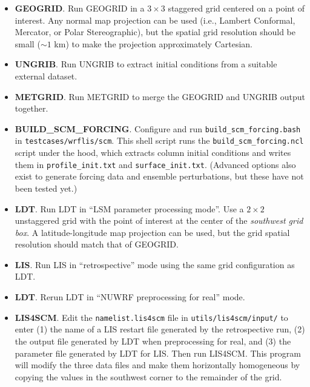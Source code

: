 \begin{itemize}

\item \textbf{GEOGRID}.  Run GEOGRID in a $3 \times 3$ staggered grid centered
on a point of interest.  Any normal map projection can be used (i.e., Lambert
Conformal, Mercator, or Polar Stereographic), but the spatial grid resolution
should be small ($\sim1$ km) to make the projection approximately Cartesian.

\item \textbf{UNGRIB}.  Run UNGRIB to extract initial conditions from a 
suitable external dataset.

\item \textbf{METGRID}.  Run METGRID to merge the GEOGRID and UNGRIB output 
together.

\item \textbf{BUILD\_SCM\_FORCING}.  Configure and run 
\texttt{build\_scm\_forcing.bash} in \texttt{testcases/wrflis/scm}.  This
shell script runs the \texttt{build\_scm\_forcing.ncl} script under the hood,
which extracts column initial conditions and writes them in
\texttt{profile\_init.txt} and \texttt{surface\_init.txt}.  (Advanced 
options also exist to generate forcing data and ensemble perturbations, but
these have not been tested yet.)

\item \textbf{LDT}.  Run LDT in ``LSM parameter processing mode''.  Use a
$2 \times 2$ unstaggered grid with the point of interest at the center of the 
\emph{southwest grid box}.  A latitude-longitude map projection can be used,
but the grid spatial resolution should match that of GEOGRID.

\item \textbf{LIS}.  Run LIS in ``retrospective'' mode using the same grid
configuration as LDT.

\item \textbf{LDT}.  Rerun LDT in ``NUWRF preprocessing for real'' mode.

\item \textbf{LIS4SCM}.  Edit the \texttt{namelist.lis4scm} file in 
\texttt{utils/lis4scm/input/} to enter (1) the name of a LIS restart file 
generated by the retrospective run, (2) the output file generated by LDT when 
preprocessing for real, and (3) the parameter file generated by LDT for LIS.  
Then run LIS4SCM.  This program will modify the three data files and make them
horizontally homogeneous by copying the values in the southwest corner to the 
remainder of the grid.


\end{itemize}
